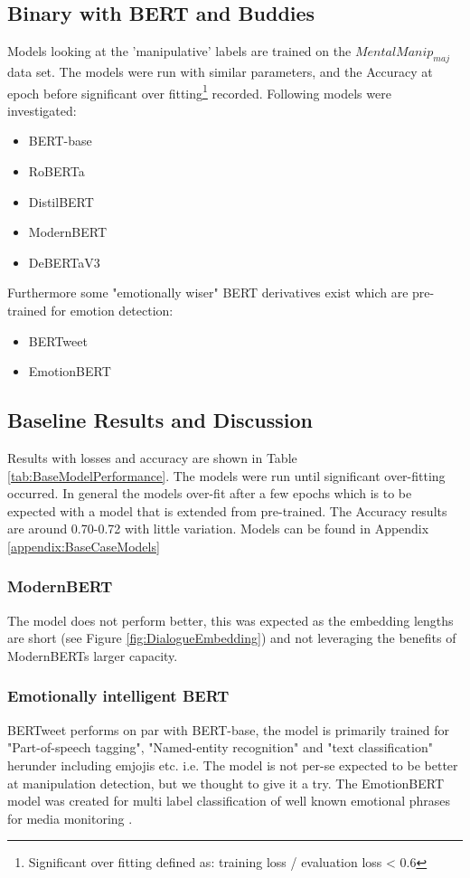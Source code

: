 \documentclass[
	letterpaper, %
	12pt, %
	unnumberedsections, %
	twoside, %
]{LTJournalArticle}
\begin{document}
\subsection{Binary with BERT and Buddies}
Models looking at the 'manipulative' labels are trained on the $MentalManip_{maj}$ data set. The models were run with similar parameters, and the Accuracy at epoch before significant over fitting\footnote{Significant over fitting defined as: training loss / evaluation loss < 0.6} recorded. Following models were investigated:
\begin{itemize}
	\item BERT-base \cite{BERT-base}
	\item RoBERTa \cite{RoBERTa}
	\item DistilBERT \cite{DistilBERT}
	\item ModernBERT \cite{ModernBERT}
	\item DeBERTaV3 \cite{DeBERTaV3}
\end{itemize}
Furthermore some "emotionally wiser" BERT derivatives exist which are pre-trained for emotion detection:
\begin{itemize}
	\item BERTweet \cite{BERTweet}
	\item EmotionBERT \cite{EmotionBERT}
\end{itemize}

\subsection{Baseline Results and Discussion}\label{sec:BaselineResults}
Results with losses and accuracy are shown in Table \ref{tab:BaseModelPerformance}. The models were run until significant over-fitting occurred. In general the models over-fit after a few epochs which is to be expected with a model that is extended from pre-trained. The Accuracy results are around 0.70-0.72 with little variation. Models can be found in Appendix \ref{appendix:BaseCaseModels}

\subsubsection{ModernBERT} The model does not perform better, this was expected as the embedding lengths are short (see Figure \ref{fig:DialogueEmbedding}) and not leveraging the benefits of ModernBERTs larger capacity.

\subsubsection{Emotionally intelligent BERT}
BERTweet performs on par with BERT-base, the model is primarily trained for "Part-of-speech tagging", "Named-entity recognition" and "text classification" \cite{BERTweet} herunder including emjojis etc. i.e. The model is not per-se expected to be better at manipulation detection, but we thought to give it a try. The EmotionBERT model was created for multi label classification of well known emotional phrases for media monitoring \cite{EmotionBERT}.
\end{document}
